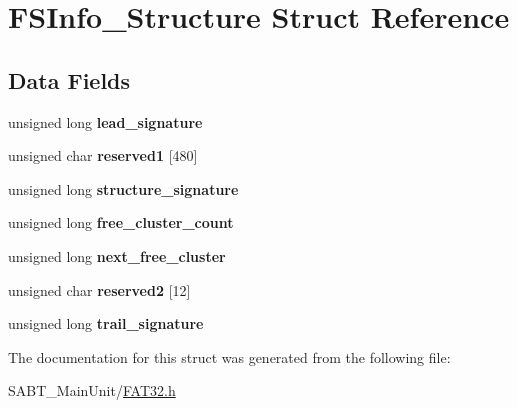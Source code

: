 \hypertarget{struct_f_s_info___structure}{\section{F\-S\-Info\-\_\-\-Structure Struct Reference}
\label{struct_f_s_info___structure}
}
\subsection*{Data Fields}
\begin{DoxyCompactItemize}
\item 
\hypertarget{struct_f_s_info___structure_a0bbf2ac4928c0a99dc51fdf467594193}{unsigned long {\bfseries lead\-\_\-signature}}\label{struct_f_s_info___structure_a0bbf2ac4928c0a99dc51fdf467594193}

\item 
\hypertarget{struct_f_s_info___structure_a16f0c58cb700e7e467644e98ee849722}{unsigned char {\bfseries reserved1} \mbox{[}480\mbox{]}}\label{struct_f_s_info___structure_a16f0c58cb700e7e467644e98ee849722}

\item 
\hypertarget{struct_f_s_info___structure_a66650527d0ccb553280dd3df5f33d3a2}{unsigned long {\bfseries structure\-\_\-signature}}\label{struct_f_s_info___structure_a66650527d0ccb553280dd3df5f33d3a2}

\item 
\hypertarget{struct_f_s_info___structure_aba897211734daa10f3fa7b9769a58458}{unsigned long {\bfseries free\-\_\-cluster\-\_\-count}}\label{struct_f_s_info___structure_aba897211734daa10f3fa7b9769a58458}

\item 
\hypertarget{struct_f_s_info___structure_a0105134751bc32b883f0bc70dcafd28b}{unsigned long {\bfseries next\-\_\-free\-\_\-cluster}}\label{struct_f_s_info___structure_a0105134751bc32b883f0bc70dcafd28b}

\item 
\hypertarget{struct_f_s_info___structure_a75597da16e6397cc2dc20ec159fb99b6}{unsigned char {\bfseries reserved2} \mbox{[}12\mbox{]}}\label{struct_f_s_info___structure_a75597da16e6397cc2dc20ec159fb99b6}

\item 
\hypertarget{struct_f_s_info___structure_aa448a23b3ea4e739472933a636b0f455}{unsigned long {\bfseries trail\-\_\-signature}}\label{struct_f_s_info___structure_aa448a23b3ea4e739472933a636b0f455}

\end{DoxyCompactItemize}


The documentation for this struct was generated from the following file\-:\begin{DoxyCompactItemize}
\item 
S\-A\-B\-T\-\_\-\-Main\-Unit/\hyperlink{_f_a_t32_8h}{F\-A\-T32.\-h}\end{DoxyCompactItemize}
